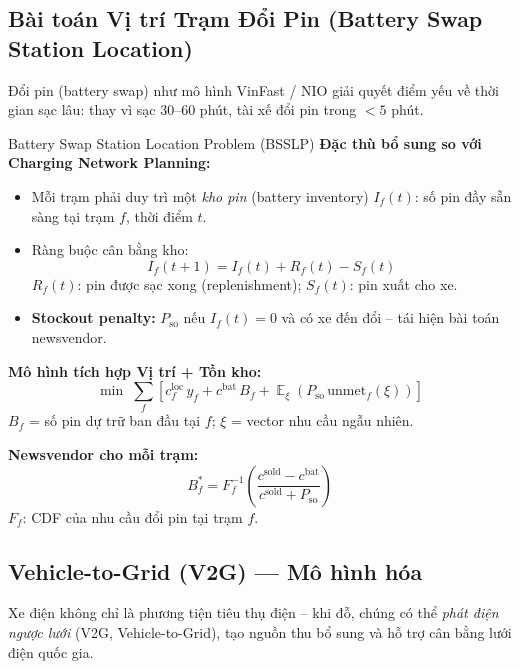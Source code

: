 \documentclass[12pt,a4paper]{article}
\DeclareMathOperator*{\E}{\mathbb{E}}
\begin{document}
\subsection{Bài toán Vị trí Trạm Đổi Pin (Battery Swap Station Location)}

Đổi pin (battery swap) như mô hình VinFast / NIO giải quyết điểm yếu về
thời gian sạc lâu: thay vì sạc 30--60 phút, tài xế đổi pin trong $<5$ phút.

\begin{definitionbox}{Battery Swap Station Location Problem (BSSLP)}
\textbf{Đặc thù bổ sung so với Charging Network Planning:}
\begin{itemize}
  \item Mỗi trạm phải duy trì một \emph{kho pin} (battery inventory)
    $I_f(t)$: số pin đầy sẵn sàng tại trạm $f$, thời điểm $t$.
  \item Ràng buộc cân bằng kho:
    \begin{equation}
      I_f(t+1) = I_f(t) + R_f(t) - S_f(t)
    \end{equation}
    $R_f(t)$: pin được sạc xong (replenishment); $S_f(t)$: pin xuất cho xe.
  \item \textbf{Stockout penalty:} $P_{\mathrm{so}}$ nếu $I_f(t)=0$ và có xe
    đến đổi -- tái hiện bài toán newsvendor.
\end{itemize}

\textbf{Mô hình tích hợp Vị trí + Tồn kho:}
\begin{equation}
  \min\;\sum_f \left[c_f^{\mathrm{loc}}\,y_f
    + c^{\mathrm{bat}}\,B_f
    + \E_\xi\!\left(P_{\mathrm{so}}\,\mathrm{unmet}_f(\xi)\right)\right]
\end{equation}
$B_f$ = số pin dự trữ ban đầu tại $f$; $\xi$ = vector nhu cầu ngẫu nhiên.
\end{definitionbox}

\textbf{Newsvendor cho mỗi trạm:}
\begin{equation}
  B_f^* = F^{-1}_f\!\left(\frac{c^{\mathrm{sold}} - c^{\mathrm{bat}}}{c^{\mathrm{sold}} + P_{\mathrm{so}}}\right)
\end{equation}
$F_f$: CDF của nhu cầu đổi pin tại trạm $f$.

\subsection{Vehicle-to-Grid (V2G) --- Mô hình hóa}

Xe điện không chỉ là phương tiện tiêu thụ điện -- khi đỗ, chúng có thể
\emph{phát điện ngược lưới} (V2G, Vehicle-to-Grid), tạo nguồn thu bổ sung
và hỗ trợ cân bằng lưới điện quốc gia.
\end{document}
